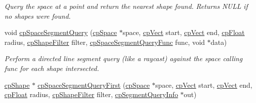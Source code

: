 \begin{DoxyCompactItemize}
\begin{DoxyCompactList}\small\item\em Query the space at a point and return the nearest shape found. Returns N\+U\+L\+L if no shapes were found. \end{DoxyCompactList}\item 
\hypertarget{group__cp_space_ga399ad2aeff96199aac2356916daced55}{}void \hyperlink{group__cp_space_ga399ad2aeff96199aac2356916daced55}{cp\+Space\+Segment\+Query} (\hyperlink{structcp_space}{cp\+Space} $\ast$space, \hyperlink{structcp_vect}{cp\+Vect} start, \hyperlink{structcp_vect}{cp\+Vect} end, \hyperlink{group__basic_types_gac1ed65573e035bf892505768c852d8d3}{cp\+Float} radius, \hyperlink{structcp_shape_filter}{cp\+Shape\+Filter} filter, \hyperlink{group__cp_space_ga9046beaeba5728c5e954f0f1dc2ae130}{cp\+Space\+Segment\+Query\+Func} func, void $\ast$data)\label{group__cp_space_ga399ad2aeff96199aac2356916daced55}

\begin{DoxyCompactList}\small\item\em Perform a directed line segment query (like a raycast) against the space calling {\ttfamily func} for each shape intersected. \end{DoxyCompactList}\item 
\hypertarget{group__cp_space_ga724f70039c4c1982799a2602939b9339}{}\hyperlink{structcp_shape}{cp\+Shape} $\ast$ \hyperlink{group__cp_space_ga724f70039c4c1982799a2602939b9339}{cp\+Space\+Segment\+Query\+First} (\hyperlink{structcp_space}{cp\+Space} $\ast$space, \hyperlink{structcp_vect}{cp\+Vect} start, \hyperlink{structcp_vect}{cp\+Vect} end, \hyperlink{group__basic_types_gac1ed65573e035bf892505768c852d8d3}{cp\+Float} radius, \hyperlink{structcp_shape_filter}{cp\+Shape\+Filter} filter, \hyperlink{structcp_segment_query_info}{cp\+Segment\+Query\+Info} $\ast$out)\label{group__cp_space_ga724f70039c4c1982799a2602939b9339}


\end{DoxyCompactItemize}
